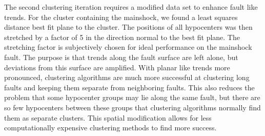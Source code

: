 \documentclass[11pt]{article}
\begin{document}
    
    
    The second clustering iteration requires a modified data set to enhance
fault like trends. For the cluster containing the mainshock, we found a
least squares distance best fit plane to the cluster. The positions of
all hypocenters was then stretched by a factor of 5 in the direction
normal to the best fit plane. The stretching factor is subjectively
chosen for ideal performance on the mainshock fault. The purpose is that
trends along the fault surface are left alone, but deviations from this
surface are amplified. With planar like trends more pronounced,
clustering algorithms are much more successful at clustering long faults
and keeping them separate from neighboring faults. This also reduces the
problem that some hypocenter groups may lie along the same fault, but
there are so few hypocenters between these groups that clustering
algorithms normally find them as separate clusters. This spatial
modification allows for less computationally expensive clustering
methods to find more success.
\end{document}
